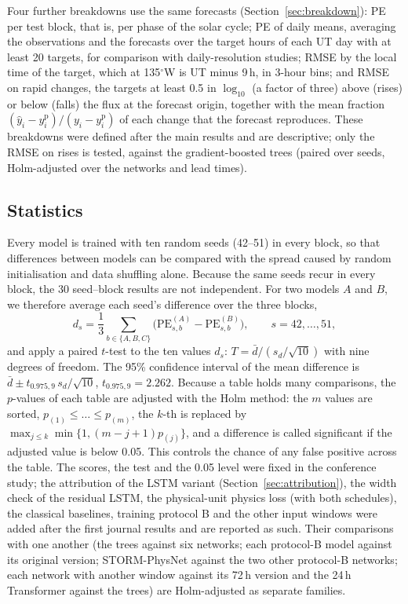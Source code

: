 \documentclass[a4paper,fleqn]{cas-dc}
\newcommand{\PE}{\mathrm{PE}}
\begin{document}
Four further breakdowns use the same forecasts (Section~\ref{sec:breakdown}): PE per test block, that is, per phase
of the solar cycle; PE of daily means, averaging the observations and the forecasts over the target hours of each UT
day with at least 20 targets, for comparison with daily-resolution studies; RMSE by the local time of the target,
which at 135\(^\circ\)W is UT minus 9\,h, in 3-hour bins; and RMSE on rapid changes, the targets at least 0.5 in
\(\log_{10}\) (a factor of three) above (rises) or below (falls) the flux at the forecast origin, together with the
mean fraction \((\hat y_i-y^{\mathrm p}_i)/(y_i-y^{\mathrm p}_i)\) of each change that the forecast reproduces. These
breakdowns were defined after the main results and are descriptive; only the RMSE on rises is tested, against the
gradient-boosted trees (paired over seeds, Holm-adjusted over the networks and lead times).

\subsection{Statistics}
\label{sec:stats}
Every model is trained with ten random seeds (42--51) in every block, so that differences between models can be
compared with the spread caused by random initialisation and data shuffling alone. Because the same seeds recur in
every block, the 30 seed--block results are not independent. For two models \(A\) and \(B\), we therefore average
each seed's difference over the three blocks,
\begin{equation}
d_s=\frac13\sum_{b\in\{A,B,C\}}\Big(\PE^{(A)}_{s,b}-\PE^{(B)}_{s,b}\Big),\qquad s=42,\dots,51, \label{eq:dseed}
\end{equation}
and apply a paired \(t\)-test to the ten values \(d_s\): \(T=\bar d/(s_d/\sqrt{10})\) with nine degrees of
freedom. The 95\% confidence interval of the mean difference is \(\bar d\pm t_{0.975,9}\,s_d/\sqrt{10}\),
\(t_{0.975,9}=2.262\). Because a table holds many comparisons, the \(p\)-values of each table are adjusted with the
Holm method: the \(m\) values are sorted, \(p_{(1)}\le\dots\le p_{(m)}\), the \(k\)-th is replaced by
\(\max_{j\le k}\min\{1,(m-j+1)p_{(j)}\}\), and a difference is called significant if the adjusted value is below
0.05. This controls the chance of any false positive across the table. The scores, the test and the 0.05 level were
fixed in the conference study; the attribution of the LSTM variant (Section~\ref{sec:attribution}), the width check
of the residual LSTM, the physical-unit physics loss (with both schedules), the classical baselines, training protocol B and the other input windows were
added after the first journal results and are reported as such. Their comparisons with one another (the trees
against six networks; each protocol-B model against its original version; STORM-PhysNet against the two other
protocol-B networks; each network with another window against its 72\,h version and the 24\,h Transformer against
the trees) are Holm-adjusted as separate families.
\end{document}

